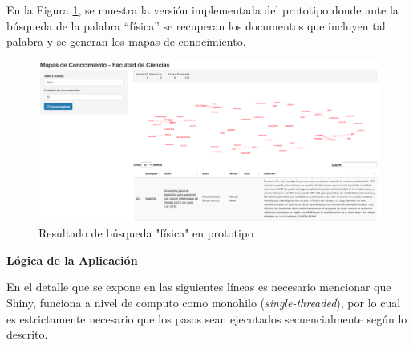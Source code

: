 \documentclass[
  12pt,
  openany]{book}
\begin{document}
En la Figura \ref{fig:prototipoapp}, se muestra la versión implementada del prototipo donde ante la búsqueda de la palabra ``física'' se recuperan los documentos que incluyen tal palabra y se generan los mapas de conocimiento.

\begin{figure}

{\centering \includegraphics[width=0.8\linewidth]{images/05-desarrollo/2_ciclo/UI/prototipo_app} 

}

\caption{Resultado de búsqueda "física" en prototipo}\label{fig:prototipoapp}
\end{figure}

\textbf{Lógica de la Aplicación}

En el detalle que se expone en las siguientes líneas es necesario mencionar que Shiny, funciona a nivel de computo como monohilo (\emph{single-threaded}), por lo cual es estrictamente necesario que los pasos sean ejecutados secuencialmente según lo descrito.
\end{document}
